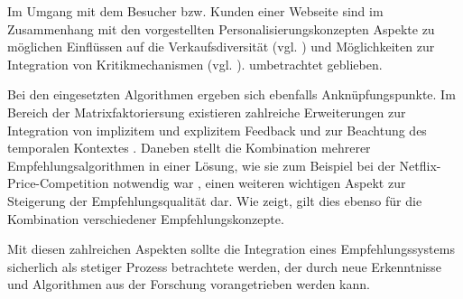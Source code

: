 Im Umgang mit dem Besucher bzw. Kunden einer Webseite sind im Zusammenhang mit den vorgestellten Personalisierungskonzepten Aspekte zu möglichen Einflüssen auf die Verkaufsdiversität (vgl. \citep{Fleder09}) und Möglichkeiten zur Integration von Kritikmechanismen (vgl. \citep{hb_13}). umbetrachtet geblieben.

Bei den eingesetzten Algorithmen ergeben sich ebenfalls Anknüpfungspunkte. Im Bereich der Matrixfaktoriersung existieren zahlreiche Erweiterungen zur Integration von implizitem und explizitem Feedback \citep{Joachims05} und zur Beachtung des temporalen Kontextes \citep{Boughareb11}. Daneben stellt die Kombination mehrerer Empfehlungsalgorithmen in einer Lösung, wie sie zum Beispiel bei der Netflix-Price-Competition notwendig war \citep{netflix2012_2}, einen weiteren wichtigen Aspekt zur Steigerung der Empfehlungsqualität dar. Wie \citep{Forbes11} zeigt, gilt dies ebenso  für die Kombination verschiedener Empfehlungskonzepte. 

Mit diesen zahlreichen Aspekten sollte die Integration eines Empfehlungssystems sicherlich als stetiger Prozess betrachtete werden, der durch neue Erkenntnisse und Algorithmen aus der Forschung vorangetrieben werden kann.



